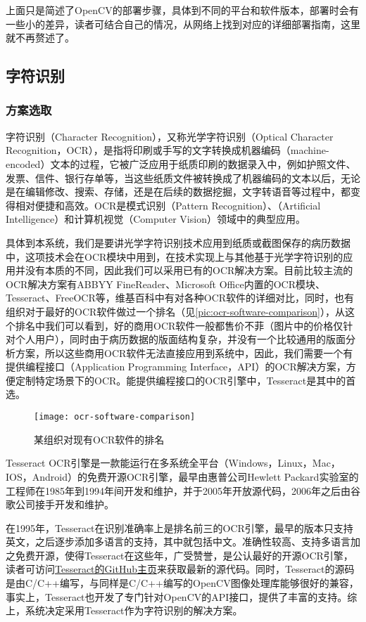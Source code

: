 上面只是简述了OpenCV的部署步骤，具体到不同的平台和软件版本，部署时会有一些小的差异，读者可结合自己的情况，从网络上找到对应的详细部署指南，这里就不再赘述了。

\subsection{字符识别}
\subsubsection{方案选取}
字符识别（Character Recognition），又称光学字符识别（Optical Character Recognition，OCR），是指将印刷或手写的文字转换成机器编码（machine-encoded）文本的过程，它被广泛应用于纸质印刷的数据录入中，例如护照文件、发票、信件、银行存单等，当这些纸质文件被转换成了机器编码的文本以后，无论是在编辑修改、搜索、存储，还是在后续的数据挖掘，文字转语音等过程中，都变得相对便捷和高效。OCR是模式识别（Pattern Recognition）、（Artificial Intelligence）和计算机视觉（Computer Vision）领域中的典型应用\citep{wiki:OCR}。

具体到本系统，我们是要讲光学字符识别技术应用到纸质或截图保存的病历数据中，这项技术会在OCR模块中用到，在技术实现上与其他基于光学字符识别的应用并没有本质的不同，因此我们可以采用已有的OCR解决方案。目前比较主流的OCR解决方案有ABBYY FineReader、Microsoft Office内置的OCR模块、Tesseract、FreeOCR等，维基百科中有对各种OCR软件的详细对比\citep{wiki:OCRcomparison}，同时，也有组织对于最好的OCR软件做过一个排名（见\autoref{pic:ocr-software-comparison}），从这个排名中我们可以看到，好的商用OCR软件一般都售价不菲（图片中的价格仅针对个人用户），同时由于病历数据的版面结构复杂，并没有一个比较通用的版面分析方案，所以这些商用OCR软件无法直接应用到系统中，因此，我们需要一个有提供编程接口（Application Programming Interface，API）的OCR解决方案，方便定制特定场景下的OCR。能提供编程接口的OCR引擎中，Tesseract是其中的首选。

\begin{figure}
	\centering
	\texttt{[image: ocr-software-comparison]}
	\caption{某组织对现有OCR软件的排名}
	\label{pic:ocr-software-comparison}
\end{figure}

Tesseract OCR引擎是一款能运行在多系统全平台（Windows，Linux，Mac，IOS，Android）的免费开源OCR引擎，最早由惠普公司Hewlett Packard实验室的工程师在1985年到1994年间开发和维护，并于2005年开放源代码，2006年之后由谷歌公司接手开发和维护\citep{wiki:Tesseract}。

在1995年，Tesseract在识别准确率上是排名前三的OCR引擎，最早的版本只支持英文，之后逐步添加多语言的支持，其中就包括中文。准确性较高、支持多语言加之免费开源，使得Tesseract在这些年，广受赞誉，是公认最好的开源OCR引擎，读者可访问\href{https://github.com/tesseract-ocr/tesseract}{Tesseract的GitHub主页}来获取最新的源代码。同时，Tesseract的源码是由C/C++编写，与同样是C/C++编写的OpenCV图像处理库能够很好的兼容，事实上，Tesseract也开发了专门针对OpenCV的API接口，提供了丰富的支持。综上，系统决定采用Tesseract作为字符识别的解决方案。

